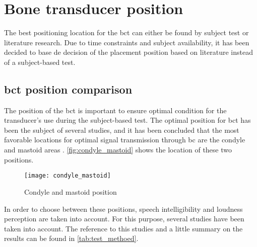 \section{Bone transducer position}
\label{sec:bc_pos}

The best positioning location for the \gls{bct} can either be found by subject test or literature research. Due to time constraints and subject availability, it has been decided to base de decision of the placement position based on literature instead of a subject-based test.

\subsection{\gls{bct} position comparison}
The position of the \gls{bct} is important to ensure optimal condition for the transducer's use during  the subject-based test. The optimal position for \gls{bct} has been the subject of several studies, and it has been concluded that the most favorable locations for optimal signal transmission through \gls{bc} are the condyle and mastoid areas \citep{cat_test}. \autoref{fig:condyle_mastoid} shows the location of these two positions.

\begin{figure}[H]
	\centering
		\texttt{[image: condyle\_mastoid]}
		\caption{Condyle and mastoid position \citep{cat_test}}
		\label{fig:condyle_mastoid}
\end{figure}

In order to choose between these positions, speech intelligibility and loudness perception are taken into account. For this purpose, several studies have been taken into account. The reference to this studies and a little summary on the results can be found in  \autoref{tab:test_methoed}.

